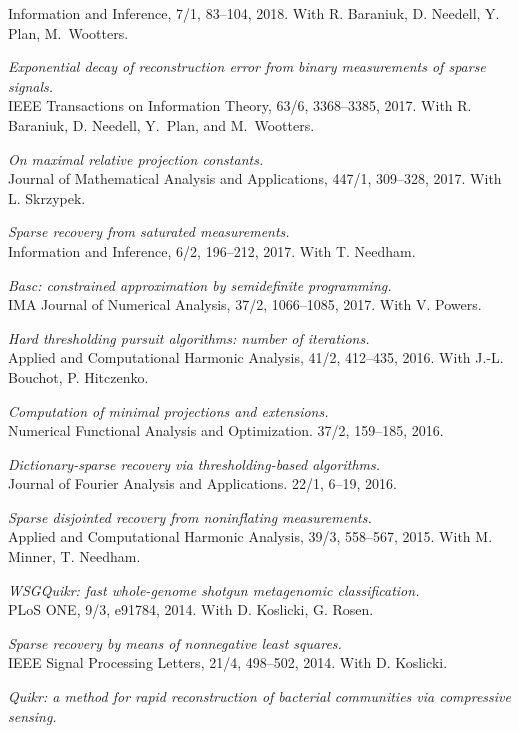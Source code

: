 \documentclass[11pt]{article}
\begin{document}
Information and Inference, 7/1, 83--104, 2018.
With R. Baraniuk, D. Needell, Y. Plan, M.~Wootters.
\item {\sl Exponential decay of reconstruction error from binary measurements of sparse signals.}\\
IEEE Transactions on Information Theory, 63/6, 3368--3385, 2017.
With R. Baraniuk, D. Needell, Y.~Plan, and \mbox{M.~Wootters}.
\item {\sl On maximal relative projection constants.}\\
Journal of Mathematical Analysis and Applications,  447/1, 309--328, 2017.
With L. Skrzypek.
\item {\sl  Sparse recovery from saturated measurements.}\\
Information and Inference, 6/2, 196--212, 2017.
With T. Needham.
\item{\sl {\sf Basc}: constrained approximation by semidefinite programming.}\\
IMA Journal of Numerical Analysis, 37/2, 1066--1085, 2017.
With V. Powers.
\item {\sl Hard thresholding pursuit algorithms: number of iterations.}\\
Applied and Computational Harmonic Analysis, 
41/2, 412--435, 2016.
With J.-L. Bouchot, P. Hitczenko. 
\item {\sl Computation of minimal projections and extensions.}\\
Numerical Functional Analysis and Optimization. 37/2, 159--185, 2016.
\item {\sl Dictionary-sparse recovery via thresholding-based algorithms.}\\ 
Journal of Fourier Analysis and Applications. 22/1, 6--19, 2016.
\item {\sl Sparse disjointed recovery from noninflating measurements.}\\
Applied and Computational Harmonic Analysis, 39/3, 558--567, 2015.
With M. Minner, T. Needham.
\item {\sl WSGQuikr: fast whole-genome shotgun metagenomic classification.}\\
PLoS ONE, 9/3, e91784, 2014. 
With D. Koslicki, G. Rosen.
\item{\sl Sparse recovery by means of nonnegative least squares.}\\
IEEE Signal Processing Letters, 21/4, 498--502, 2014. 
With D. Koslicki.
\item {\sl Quikr: a method for rapid reconstruction of bacterial communities via compressive sensing.}\\
\end{document}
